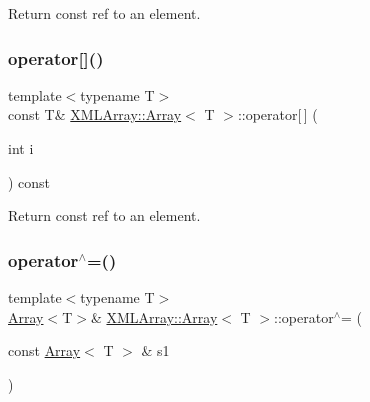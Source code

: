 Return const ref to an element. 

\mbox{\label{classXMLArray_1_1Array_a8e51d308c4e6b81cdbf1be40377afda8}} 
\subsubsection{\texorpdfstring{operator[]()}{operator[]()}\hspace{0.1cm}{\footnotesize\ttfamily [4/4]}}
{\footnotesize\ttfamily template$<$typename T$>$ \\
const T\& \mbox{\hyperlink{classXMLArray_1_1Array}{X\+M\+L\+Array\+::\+Array}}$<$ T $>$\+::operator\mbox{[}$\,$\mbox{]} (\begin{DoxyParamCaption}\item[{int}]{i }\end{DoxyParamCaption}) const\hspace{0.3cm}{\ttfamily [inline]}}



Return const ref to an element. 

\mbox{\label{classXMLArray_1_1Array_a8e2621caf3277b85e6898a3eceb9b233}} 
\subsubsection{\texorpdfstring{operator$^\wedge$=()}{operator^=()}\hspace{0.1cm}{\footnotesize\ttfamily [1/4]}}
{\footnotesize\ttfamily template$<$typename T$>$ \\
\mbox{\hyperlink{classXMLArray_1_1Array}{Array}}$<$T$>$\& \mbox{\hyperlink{classXMLArray_1_1Array}{X\+M\+L\+Array\+::\+Array}}$<$ T $>$\+::operator$^\wedge$= (\begin{DoxyParamCaption}\item[{const \mbox{\hyperlink{classXMLArray_1_1Array}{Array}}$<$ T $>$ \&}]{s1 }\end{DoxyParamCaption})\hspace{0.3cm}{\ttfamily [inline]}}




